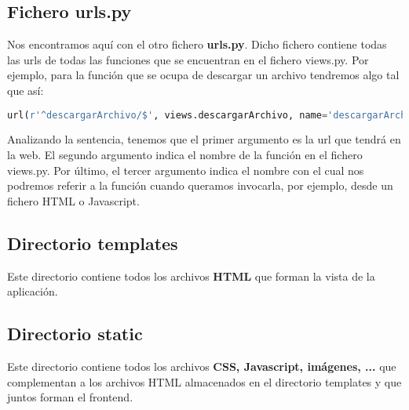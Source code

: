 \subsection{Fichero urls.py}
Nos encontramos aquí con el otro fichero \textbf{urls.py}. Dicho fichero contiene todas las urls de todas las funciones que se encuentran en el fichero views.py. Por ejemplo, para la función que se ocupa de descargar un archivo tendremos algo tal que así: \\

\begin{lstlisting}[language=python]
	url(r'^descargarArchivo/$', views.descargarArchivo, name='descargarArchivo'),
\end{lstlisting}

Analizando la sentencia, tenemos que el primer argumento es la url que tendrá en la web. El segundo argumento indica el nombre de la función en el fichero views.py. Por último, el tercer argumento indica el nombre con el cual nos podremos referir a la función cuando queramos invocarla, por ejemplo, desde un fichero HTML o Javascript. \\

\subsection{Directorio templates}
Este directorio contiene todos los archivos \textbf{HTML} que forman la vista de la aplicación. \\ 

\subsection{Directorio static}
Este directorio contiene todos los archivos \textbf{CSS, Javascript, imágenes, ...} que complementan a los archivos HTML almacenados en el directorio templates y que juntos forman el frontend. \\ 